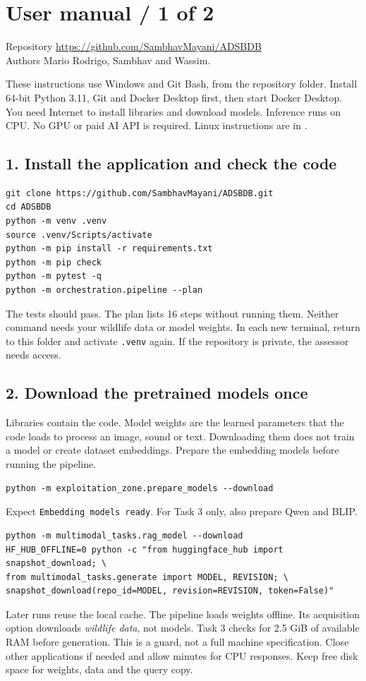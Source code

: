 \documentclass[10pt,a4paper]{article}
\begin{document}
\fontsize{10.5}{13.2}\selectfont
\thispagestyle{empty}
\section*{User manual / 1 of 2}
Repository \url{https://github.com/SambhavMayani/ADSBDB}\\
Authors Mario Rodrigo, Sambhav and Wassim.

These instructions use Windows and Git Bash, from the repository folder. Install 64-bit Python 3.11, Git and Docker Desktop first, then start Docker Desktop. You need Internet to install libraries and download models. Inference runs on CPU. No GPU or paid AI API is required. Linux instructions are in .

\subsection*{1. Install the application and check the code}
\begin{Verbatim}
git clone https://github.com/SambhavMayani/ADSBDB.git
cd ADSBDB
python -m venv .venv
source .venv/Scripts/activate
python -m pip install -r requirements.txt
python -m pip check
python -m pytest -q
python -m orchestration.pipeline --plan
\end{Verbatim}
The tests should pass. The plan lists 16 steps without running them. Neither command needs your wildlife data or model weights. In each new terminal, return to this folder and activate \texttt{.venv} again. If the repository is private, the assessor needs access.

\subsection*{2. Download the pretrained models once}
Libraries contain the code. Model weights are the learned parameters that the code loads to process an image, sound or text. Downloading them does not train a model or create dataset embeddings. Prepare the embedding models before running the pipeline.
\begin{Verbatim}
python -m exploitation_zone.prepare_models --download
\end{Verbatim}
Expect \texttt{Embedding models ready}. For Task 3 only, also prepare Qwen and BLIP.
\begin{Verbatim}[fontsize=\footnotesize]
python -m multimodal_tasks.rag_model --download
HF_HUB_OFFLINE=0 python -c "from huggingface_hub import snapshot_download; \
from multimodal_tasks.generate import MODEL, REVISION; \
snapshot_download(repo_id=MODEL, revision=REVISION, token=False)"
\end{Verbatim}
Later runs reuse the local cache. The pipeline loads weights offline. Its acquisition option downloads \emph{wildlife data}, not models. Task 3 checks for 2.5 GiB of available RAM before generation. This is a guard, not a full machine specification. Close other applications if needed and allow minutes for CPU responses. Keep free disk space for weights, data and the query copy.
\end{document}

